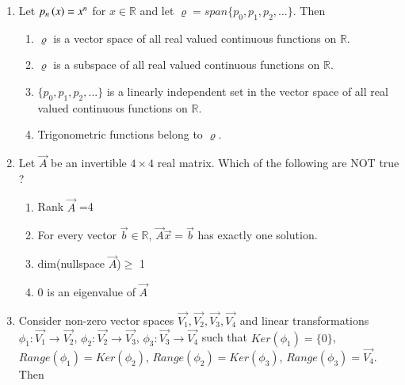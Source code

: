 \begin{enumerate}[label=\thesection.\arabic*.,ref=\thesection.\theenumi]
\begin{enumerate}
\end{enumerate}
%
\solution

\item Let $p_n\left(x\right)=x^n$ for $x\in\mathbb{R}$ and let $\varrho=span\{p_0,p_1,p_2,...\}$. Then
\begin{enumerate}
    \item $\varrho$ is a vector space of all real valued continuous functions on $\mathbb{R}$.
    \item $\varrho$ is a subspace of all real valued continuous functions on $\mathbb{R}$.
    \item $\{p_0,p_1,p_2,...\}$ is a linearly independent set in the vector space of all real valued continuous functions on $\mathbb{R}$.
    \item Trigonometric functions belong to $\varrho$.
\end{enumerate}
%
%
\solution


\item Let $\vec{A}$ be an invertible $4 \times 4$ real matrix. Which of the following are NOT true ? 
\begin{enumerate}
\item  Rank $\vec{A}$ =4
\item For every vector $\vec{b} \in \mathbb{R}$, $\vec{A}\vec{x}=\vec{b}$ has exactly one solution. 
\item dim(nullspace $\vec{A}$)$\geq$ 1
\item 0 is an eigenvalue of $\vec{A}$
\end{enumerate}
%
\solution

\item 	Consider non-zero vector spaces $\vec{V_1}, \vec{V_2}, \vec{V_3}, \vec{V_4}$ and linear transformations $\phi_1 : \vec{V_1} \rightarrow \vec{V_2}$, $\phi_2 : \vec{V_2} \rightarrow \vec{V_3}$, $\phi_3 : \vec{V_3} \rightarrow \vec{V_4}$ such that $Ker(\phi_1) = \{0\}$, $Range(\phi_1) = Ker(\phi_2)$, $Range(\phi_2) = Ker(\phi_3)$, $Range(\phi_3) = \vec{V_4}$. Then \\
	

\end{enumerate}
